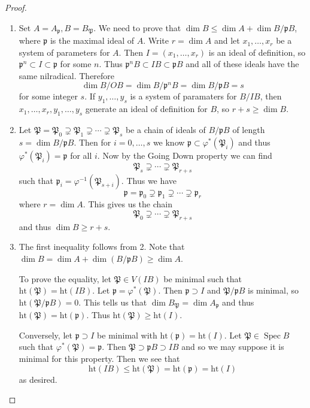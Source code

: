\documentclass[leqno, openany]{memoir}
\theoremstyle{definition}
\theoremstyle{remark}
\theoremstyle{plain}
\theoremstyle{definition}
\theoremstyle{remark}
\newcommand{\mf}[1]{\mathfrak{#1}}
\newcommand{\mr}[1]{\mathrm{#1}}
\DeclareMathOperator{\Spec}{Spec}
\begin{document}
\begin{proof}
    \begin{enumerate}
        \item Set $A = A_{\mf{p}}, B = B_{\mf{P}}$. We need to prove that $\dim B \leq \dim A + \dim B / \mf{p}B$, where $\mf{p}$ is the maximal ideal of $A$. Write $r = \dim A$ and let $x_1, \ldots, x_r$ be a system of parameters for $A$. Then $I = (x_1, \ldots, x_r)$ is an ideal of definition, so $\mf{p}^n \subset I \subset \mf{p}$ for some $n$. Thus $\mf{p}^n B \subset IB \subset \mf{p}B$ and all of these ideals have the same nilradical. Therefore
            \[ \dim B / OB = \dim B / \mf{p}^n B = \dim B / \mf{p}B = s \]
            for some integer $s$. If $y_1, \ldots, y_s$ is a system of paramaters for $B / IB$, then $x_1, \ldots, x_r, y_1, \ldots, y_s$ generate an ideal of definition for $B$, so $r + s \geq \dim B$.
        \item Let $\mf{P} = \mf{P}_0 \supsetneq \mf{P}_1 \supsetneq \cdots \supsetneq \mf{P}_s$ be a chain of ideals of $B / \mf{p}B$ of length $s = \dim B / \mf{p}B$. Then for $i = 0, \ldots, s$ we know $\mf{p} \subset \varphi^*(\mf{P}_i)$ and thus $\varphi^*(\mf{P}_i) = \mf{p}$ for all $i$. Now by the Going Down property we can find
            \[ \mf{P}_s \supsetneq \cdots \supsetneq \mf{P}_{r+s} \]
            such that $\mf{p}_i = \varphi^{-1}(\mf{P}_{s+i})$. Thus we have
            \[ \mf{p} = \mf{p}_0 \supsetneq \mf{p}_1 \supsetneq \cdots \supsetneq \mf{p}_r \]
            where $r = \dim A$. This gives us the chain
            \[ \mf{P}_0 \supsetneq \cdots \supsetneq \mf{P}_{r+s} \]
            and thus $\dim B \geq r+s$.
        \item The first inequality follows from 2. Note that $\dim B = \dim A + \dim(B / \mf{p}B) \geq \dim A$.

            To prove the equality, let $\mf{P} \in V(IB)$ be minimal such that $\mr{ht}(\mf{P}) = \mr{ht}(IB)$. Let $\mf{p} = \varphi^*(\mf{P})$. Then $\mf{p} \supset I$ and $\mf{P} / \mf{p}B$ is minimal, so $\mr{ht}(\mf{P}/\mf{p}B) = 0$. This tells us that $\dim B_{\mf{P}} = \dim A_{\mf{p}}$ and thus $\mr{ht}(\mf{P}) = \mr{ht}(\mf{p})$. Thus $\mr{ht}(\mf{P}) \geq \mr{ht}(I)$.

            Conversely, let $\mf{p} \supset I$ be minimal with $\mr{ht}(\mf{p}) = \mr{ht}(I)$. Let $\mf{P} \in \Spec B$ such that $\varphi^*(\mf{P}) = \mf{p}$. Then $\mf{P} \supset \mf{p}B \supset IB$ and so we may suppose it is minimal for this property. Then we see that
            \[ \mr{ht}(IB) \leq \mr{ht}(\mf{P}) = \mr{ht}(\mf{p}) = \mr{ht}(I) \]
            as desired. \qedhere
    \end{enumerate}
\end{proof}
\end{document}
